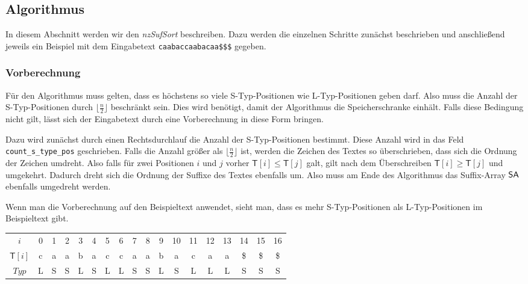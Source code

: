\subsection{Algorithmus}

In diesem Abschnitt werden wir den \emph{nzSufSort} beschreiben. Dazu werden die einzelnen Schritte zunächst beschrieben und anschließend jeweils ein Beispiel mit dem Eingabetext \texttt{caabaccaabacaa\$\$\$} gegeben.

\subsubsection{Vorberechnung}

Für den Algorithmus muss gelten, dass es höchstens so viele S-Typ-Positionen wie L-Typ-Positionen geben darf. Also muss die Anzahl der S-Typ-Positionen durch $\lfloor \frac{n}{2} \rfloor$ beschränkt sein. Dies wird benötigt, damit der Algorithmus die Speicherschranke einhält. Falls diese Bedingung nicht gilt, lässt sich der Eingabetext durch eine Vorberechnung in diese Form bringen. \par
Dazu wird zunächst durch einen Rechtsdurchlauf die Anzahl der S-Typ-Positionen bestimmt. 
Diese Anzahl wird in das Feld \texttt{count\_s\_type\_pos} geschrieben. 
Falls die Anzahl größer als $\lfloor \frac{n}{2} \rfloor$ ist, werden die Zeichen des Textes so überschrieben, dass sich die Ordnung der Zeichen umdreht. 
Also falls für zwei Positionen $i$ und $j$ vorher 
$\mathsf{T}[i] \le \mathsf{T}[j]$ 
galt, 
gilt nach dem Überschreiben $\mathsf{T}[i] \ge \mathsf{T}[j]$ und umgekehrt. 
Dadurch dreht sich die Ordnung der Suffixe des Textes ebenfalls um. 
Also muss am Ende des Algorithmus das Suffix-Array $\sa$ ebenfalls umgedreht werden. \par

Wenn man die Vorberechnung auf den Beispieltext anwendet, sieht man, dass es mehr S-Typ-Positionen als L-Typ-Positionen im Beispieltext gibt.

\begin{table}[H]
	\footnotesize
	\centering
	\begin{tabular}{c| c c c c c c c c c c c c c c c c c}
		$i$ & 0 & 1 & 2 & 3 & 4 & 5 & 6 & 7 & 8 & 9 & 10 & 11 & 12 & 13 & 14 & 15 & 16 \\
		$\mathsf{T}[i]$ & c & a & a & b & a & c & c & a & a & b & a & c & a & a & \$ & \$ & \$ \\
		$Typ$ & L & S & S & L & S & L & L & S & S & L & S & L & L & L & S & S & S
	\end{tabular}
\end{table}

